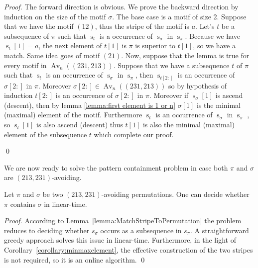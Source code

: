 \documentclass[a4paper]{llncs}
\DeclareMathOperator{\AV}{Av}
\DeclareMathOperator{\Avd}{Av}
\newcommand\Av[2]{\Avd_{{#1}}({#2})}
\newcommand{\ptext}{\pi}
\newcommand{\pmotif}{\sigma}
\DeclareMathOperator{\stripea}{s}
\newcommand{\stripe}[2]{\stripea_{{#1}}[{#2}]}
\newcommand{\stripew}[1]{\stripea_{{#1}}}
\newcommand{\ustep}{a}
\begin{document}
\begin{proof}
	The forward direction is obvious.
	We prove the backward direction by induction on the size of the motif
	$\sigma$.
	The base case is a motif of size 2. Suppose that we have the motif $(12)$, thus the stripe of the motif is $\ustep$. Let's $t$ be a subsequence of $\ptext$ such that $\stripew{t}$ is a occurrence of $\stripew{\pmotif}$ in $\stripew{\ptext}$. Because we have $\stripe{t}{1}=\ustep$, the next element of $t[1]$ is $\ptext$ is superior to  $t[1]$, so we have a match. Same idea goes of motif $(21)$.
	Now, suppose that the lemma is true for every motif in $\Av{n}{(231,213)}$. Suppose that we have a subsequence $t$ of $\ptext$ such that $\stripew{t}$ is an occurrence of $\stripew{\pmotif}$ in $\stripew{\ptext}$, then $\stripew{t[2:]}$ is an occurrence of $\pmotif[2:]$ in $\ptext$. Moreover
	$\pmotif[2:] \in \Av{n}{(231,213)}$ so by hypothesis of induction $t[2:]$ is an occurrence of $\sigma[2:]$ in $\ptext$.
	Moreover if $\stripe{\pmotif}{1}$ is ascend (descent), then by lemma \ref{lemma:first element is 1 or n} $\pmotif[1]$ is the minimal (maximal) element of the motif. Furthermore $\stripew{t}$ is an occurrence of $\stripew{\pmotif}$ in $\stripew{\ptext}$ , so $\stripe{t}{1}$ is also ascend (descent) thus $t[1]$ is also the minimal (maximal) element of the subsequence $t$ which complete our proof.


\qed
\end{proof}

We are now ready to solve the pattern containment problem in case
both $\pi$ and $\sigma$ are $(213, 231)$-avoiding.

\begin{proposition}
	Let $\pi$ and $\sigma$ be two $(213,231)$-avoiding permutations.
	One can decide whether $\pi$ contains $\sigma$ in linear-time.
\end{proposition}

\begin{proof}
According to Lemma~\ref{lemma:MatchStripeToPermutation} the problem reduces
to deciding whether $s_\sigma$ occurs as a subsequence in $s_\pi$.
A straightforward greedy approach solves this issue in linear-time.
Furthermore, in the light of Corollary~\ref{corollary:minmaxelement},
the effective construction of the two stripes is not required,
so it is an online algorithm.
\qed
\end{proof}
\end{document}
